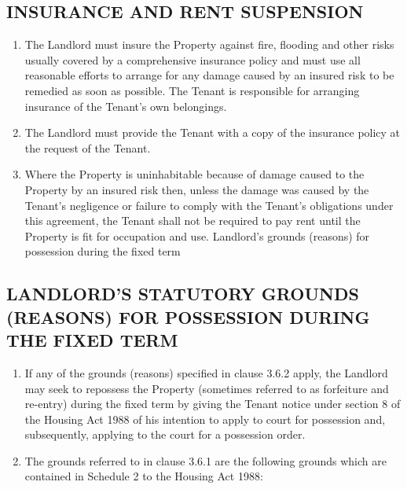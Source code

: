 \subsection{INSURANCE AND RENT SUSPENSION}
\begin{enumerate}


\item{The Landlord must insure the Property against fire, flooding and other risks usually covered by a comprehensive insurance policy and must use all reasonable efforts to arrange for any damage caused by an insured risk to be remedied as soon as possible. The Tenant is responsible for arranging insurance of the Tenant's own belongings.}
\item{The Landlord must provide the Tenant with a copy of the insurance policy at the request of the Tenant.}
\item{Where the Property is uninhabitable because of damage caused to the Property by an insured risk then, unless the damage was caused by the Tenant's negligence or failure to comply with the Tenant's obligations under this agreement, the Tenant shall not be required to pay rent until the Property is fit for occupation and use. Landlord's grounds (reasons) for possession during the fixed term}

\end{enumerate}

\subsection{LANDLORD'S STATUTORY GROUNDS (REASONS) FOR POSSESSION DURING THE FIXED TERM}


\begin{enumerate}

\item{If any of the grounds (reasons) specified in clause 3.6.2 apply, the Landlord may seek to repossess the Property (sometimes referred to as forfeiture and re-entry) during the fixed term by giving the Tenant notice under section 8 of the Housing Act 1988 of his intention to apply to court for possession and, subsequently, applying to the court for a possession order.}
\item{The grounds referred to in clause 3.6.1 are the following grounds which are contained in Schedule 2 to the Housing Act 1988:}

\end{enumerate}

